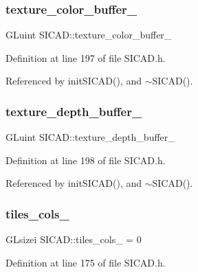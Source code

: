 \subsubsection{\texorpdfstring{texture\+\_\+color\+\_\+buffer\+\_\+}{texture\_color\_buffer\_}}
{\footnotesize\ttfamily G\+Luint S\+I\+C\+A\+D\+::texture\+\_\+color\+\_\+buffer\+\_\+\hspace{0.3cm}{\ttfamily [private]}}



Definition at line 197 of file S\+I\+C\+A\+D.\+h.



Referenced by init\+S\+I\+C\+A\+D(), and $\sim$\+S\+I\+C\+A\+D().

\mbox{\label{classSICAD_a2fed5ac56bb2206fe8f6eccc9d784015}} 
\subsubsection{\texorpdfstring{texture\+\_\+depth\+\_\+buffer\+\_\+}{texture\_depth\_buffer\_}}
{\footnotesize\ttfamily G\+Luint S\+I\+C\+A\+D\+::texture\+\_\+depth\+\_\+buffer\+\_\+\hspace{0.3cm}{\ttfamily [private]}}



Definition at line 198 of file S\+I\+C\+A\+D.\+h.



Referenced by init\+S\+I\+C\+A\+D(), and $\sim$\+S\+I\+C\+A\+D().

\mbox{\label{classSICAD_ac2678cc1ad1b008912fec7e6892b23e1}} 
\subsubsection{\texorpdfstring{tiles\+\_\+cols\+\_\+}{tiles\_cols\_}}
{\footnotesize\ttfamily G\+Lsizei S\+I\+C\+A\+D\+::tiles\+\_\+cols\+\_\+ = 0\hspace{0.3cm}{\ttfamily [private]}}



Definition at line 175 of file S\+I\+C\+A\+D.\+h.



